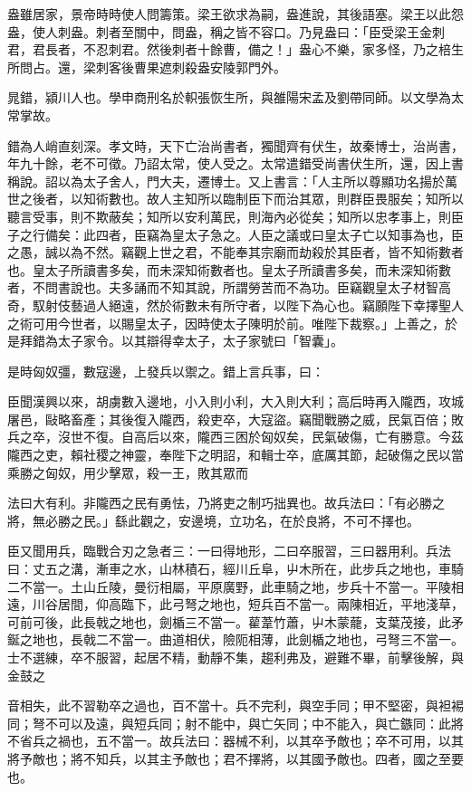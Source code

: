 \begin{pinyinscope}
盎雖居家，景帝時時使人問籌策。梁王欲求為嗣，盎進說，其後語塞。梁王以此怨盎，使人刺盎。刺者至關中，問盎，稱之皆不容口。乃見盎曰：「臣受梁王金刺君，君長者，不忍刺君。然後刺者十餘曹，備之！」盎心不樂，家多怪，乃之棓生所問占。還，梁刺客後曹果遮刺殺盎安陵郭門外。

晁錯，潁川人也。學申商刑名於軹張恢生所，與雒陽宋孟及劉帶同師。以文學為太常掌故。

錯為人峭直刻深。孝文時，天下亡治尚書者，獨聞齊有伏生，故秦博士，治尚書，年九十餘，老不可徵。乃詔太常，使人受之。太常遣錯受尚書伏生所，還，因上書稱說。詔以為太子舍人，門大夫，遷博士。又上書言：「人主所以尊顯功名揚於萬世之後者，以知術數也。故人主知所以臨制臣下而治其眾，則群臣畏服矣；知所以聽言受事，則不欺蔽矣；知所以安利萬民，則海內必從矣；知所以忠孝事上，則臣子之行備矣：此四者，臣竊為皇太子急之。人臣之議或曰皇太子亡以知事為也，臣之愚，誠以為不然。竊觀上世之君，不能奉其宗廟而劫殺於其臣者，皆不知術數者也。皇太子所讀書多矣，而未深知術數者也。皇太子所讀書多矣，而未深知術數者，不問書說也。夫多誦而不知其說，所謂勞苦而不為功。臣竊觀皇太子材智高奇，馭射伎藝過人絕遠，然於術數未有所守者，以陛下為心也。竊願陛下幸擇聖人之術可用今世者，以賜皇太子，因時使太子陳明於前。唯陛下裁察。」上善之，於是拜錯為太子家令。以其辯得幸太子，太子家號曰「智囊」。

是時匈奴彊，數寇邊，上發兵以禦之。錯上言兵事，曰：

臣聞漢興以來，胡虜數入邊地，小入則小利，大入則大利；高后時再入隴西，攻城屠邑，敺略畜產；其後復入隴西，殺吏卒，大寇盜。竊聞戰勝之威，民氣百倍；敗兵之卒，沒世不復。自高后以來，隴西三困於匈奴矣，民氣破傷，亡有勝意。今茲隴西之吏，賴社稷之神靈，奉陛下之明詔，和輯士卒，底厲其節，起破傷之民以當乘勝之匈奴，用少擊眾，殺一王，敗其眾而

法曰大有利。非隴西之民有勇怯，乃將吏之制巧拙異也。故兵法曰：「有必勝之將，無必勝之民。」繇此觀之，安邊境，立功名，在於良將，不可不擇也。

臣又聞用兵，臨戰合刃之急者三：一曰得地形，二曰卒服習，三曰器用利。兵法曰：丈五之溝，漸車之水，山林積石，經川丘阜，屮木所在，此步兵之地也，車騎二不當一。土山丘陵，曼衍相屬，平原廣野，此車騎之地，步兵十不當一。平陵相遠，川谷居間，仰高臨下，此弓弩之地也，短兵百不當一。兩陳相近，平地淺草，可前可後，此長戟之地也，劍楯三不當一。雚葦竹蕭，屮木蒙蘢，支葉茂接，此矛鋋之地也，長戟二不當一。曲道相伏，險阨相薄，此劍楯之地也，弓弩三不當一。士不選練，卒不服習，起居不精，動靜不集，趨利弗及，避難不畢，前擊後解，與金鼓之

音相失，此不習勒卒之過也，百不當十。兵不完利，與空手同；甲不堅密，與袒裼同；弩不可以及遠，與短兵同；射不能中，與亡矢同；中不能入，與亡鏃同：此將不省兵之禍也，五不當一。故兵法曰：器械不利，以其卒予敵也；卒不可用，以其將予敵也；將不知兵，以其主予敵也；君不擇將，以其國予敵也。四者，國之至要也。


\end{pinyinscope}
